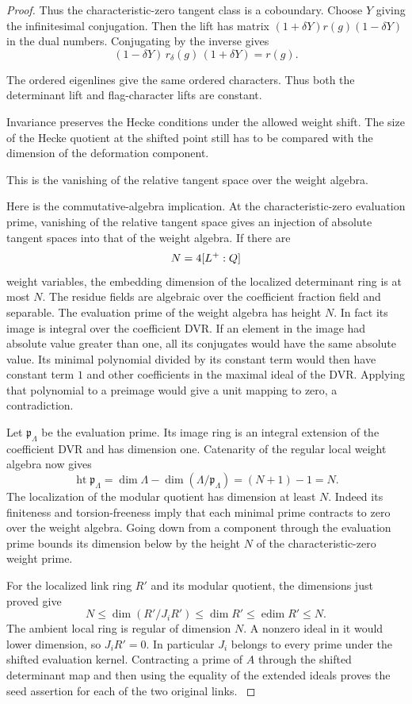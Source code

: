 \begin{proof}
Thus the characteristic-zero tangent class is a coboundary.
Choose \(Y\) giving the infinitesimal conjugation. Then the lift has
matrix \((1+\delta Y)r(g)(1-\delta Y)\) in the dual numbers.
Conjugating by the inverse gives
\[
     (1-\delta Y)\,r_\delta(g)\,(1+\delta Y)=r(g).
\]

The ordered eigenlines give the same ordered characters.
Thus both the determinant lift and flag-character lifts are
constant.

Invariance preserves the Hecke conditions under the allowed weight shift. The size of the Hecke quotient at the shifted point still has to be compared with the dimension of the deformation component.


This is the vanishing of the relative tangent space
over the weight algebra.
\hfill\mbox{\cite{thorne-adjoint}}\label{cor:ordinary-promodularity-2}

Here is the commutative-algebra implication. At the
characteristic-zero evaluation prime, vanishing of the
relative tangent space gives an injection of absolute
tangent spaces into that of the weight algebra. If
there are
\[
 N=4[L^+:Q]
\]
weight variables, the embedding
dimension of the localized determinant ring is at
most \(N\). The residue fields are algebraic over the
coefficient fraction field and separable. The evaluation
prime of the weight algebra has height \(N\). In fact
its image is integral over the coefficient DVR. If an
element in the image had absolute value greater than
one, all its conjugates would have the same absolute
value. Its minimal polynomial divided by its constant
term would then have constant term \(1\) and other
coefficients in the maximal ideal of the DVR. Applying
that polynomial to a preimage would give a unit mapping
to zero, a contradiction.

Let \(\mathfrak p_\Lambda\) be the evaluation prime. Its image ring is an integral extension of the coefficient DVR and has dimension one. Catenarity of the regular local weight algebra now gives
\[
 \operatorname{ht}\mathfrak p_\Lambda
 =\dim\Lambda-\dim(\Lambda/\mathfrak p_\Lambda)
 =(N+1)-1=N .
\]
The localization
of the modular quotient has dimension at least \(N\).
Indeed its finiteness and torsion-freeness imply that
each minimal prime contracts to zero over the weight
algebra. Going down from a component through the
evaluation prime bounds its dimension below by the
height \(N\) of the characteristic-zero weight prime.

For the localized link ring \(R'\) and its modular quotient,
the dimensions just proved give
\[
       N\le\dim(R'/J_iR')\le\dim R'\le\operatorname{edim}R'\le N .
\]
The ambient local ring is regular of dimension \(N\).
A nonzero ideal in it would lower dimension, so \(J_iR'=0\).
In particular \(J_i\) belongs to every prime under the
shifted evaluation kernel. Contracting a prime of \(A\)
through the shifted determinant map and then using the
equality of the extended ideals proves the seed assertion
for each of the two original links.
\label{cor:ordinary-promodularity-3}

\end{proof}

